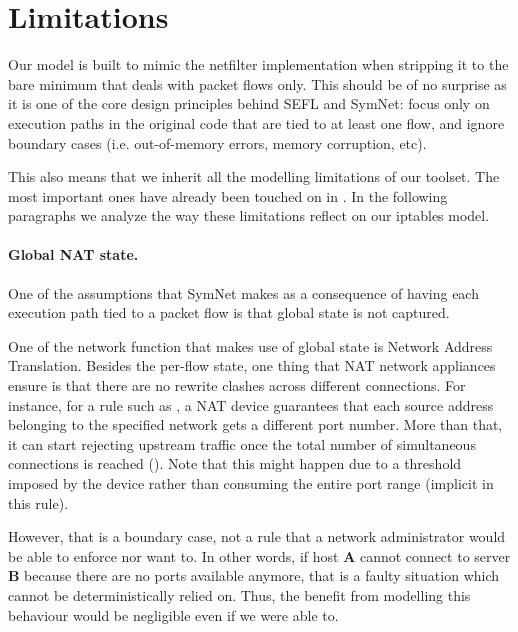 \section{Limitations}\label{sec:limitations}
Our model is built to mimic the netfilter implementation when stripping it to
the bare minimum that deals with packet flows only.  This should be of no
surprise as it is one of the core design principles behind SEFL and SymNet:
focus only on execution paths in the original code that are tied to at least
one flow, and ignore boundary cases (i.e. out-of-memory errors, memory
corruption, etc).

This also means that we inherit all the modelling limitations of our toolset.
The most important ones have already been touched on in
.  In the following paragraphs we
analyze the way these limitations reflect on our iptables model.

\paragraph{Global NAT state.}
One of the assumptions that SymNet makes as a consequence of having each
execution path tied to a packet flow is that global state is not captured.

One of the network function that makes use of global state is Network Address
Translation.  Besides the per-flow state, one thing that NAT network appliances
ensure is that there are no rewrite clashes across different connections.  For
instance, for a rule such as , a NAT device guarantees that each source address belonging to the
specified network gets a different port number.  More than that, it can start
rejecting upstream traffic once the total number of simultaneous connections is
reached ().  Note that this might
happen due to a threshold imposed by the device rather than consuming the
entire port range (implicit in this rule).

However, that is a boundary case, not a rule that a network administrator would
be able to enforce nor want to.  In other words, if host \textbf{A} cannot
connect to server \textbf{B} because there are no ports available anymore, that
is a faulty situation which cannot be deterministically relied on.  Thus, the
benefit from modelling this behaviour would be negligible even if we were able
to.

